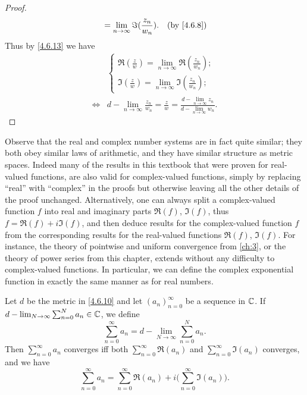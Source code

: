 \begin{proof}
\begin{align*}
                     & = \lim_{n \to \infty} \Im(\frac{z_n}{w_n}).                                                                       & \text{(by \cref{4.6.8})}
  \end{align*}
  Thus by \cref{4.6.13} we have
  \begin{align*}
         & \begin{cases}
             \Re(\frac{z}{w}) = \lim_{n \to \infty} \Re(\frac{z_n}{w_n}); \\
             \Im(\frac{z}{w}) = \lim_{n \to \infty} \Im(\frac{z_n}{w_n});
           \end{cases}                                                             \\
    \iff & d - \lim_{n \to \infty} \frac{z_n}{w_n} = \frac{z}{w} = \frac{d - \lim_{n \to \infty} z_n}{d - \lim_{n \to \infty} w_n}.
  \end{align*}
\end{proof}

\begin{note}
  Observe that the real and complex number systems are in fact quite similar;
  they both obey similar laws of arithmetic, and they have similar structure as metric spaces.
  Indeed many of the results in this textbook that were proven for real-valued functions, are also valid for complex-valued functions, simply by replacing ``real'' with ``complex'' in the proofs but otherwise leaving all the other details of the proof unchanged.
  Alternatively, one can always split a complex-valued function \(f\) into real and imaginary parts \(\Re(f)\), \(\Im(f)\), thus \(f = \Re(f) + i \Im(f)\), and then deduce results for the complex-valued function \(f\) from the corresponding results for the real-valued functions \(\Re(f)\), \(\Im(f)\).
  For instance, the theory of pointwise and uniform convergence from \cref{ch:3}, or the theory of power series from this chapter, extends without any difficulty to complex-valued functions.
  In particular, we can define the complex exponential function in exactly the same manner as for real numbers.
\end{note}

\begin{ac}\label{ac:4.6.6}
  Let \(d\) be the metric in \cref{4.6.10} and let \((a_n)_{n = 0}^\infty\) be a sequence in \(\mathbb{C}\).
  If \(d - \lim_{N \to \infty} \sum_{n = 0}^N a_n \in \mathbb{C}\), we define
  \[
    \sum_{n = 0}^\infty a_n = d - \lim_{N \to \infty} \sum_{n = 0}^N a_n.
  \]
  Then \(\sum_{n = 0}^\infty a_n\) converges iff both \(\sum_{n = 0}^\infty \Re(a_n)\) and \(\sum_{n = 0}^\infty \Im(a_n)\) converges, and we have
  \[
    \sum_{n = 0}^\infty a_n = \sum_{n = 0}^\infty \Re(a_n) + i \bigg(\sum_{n = 0}^\infty \Im(a_n)\bigg).
  \]
\end{ac}

